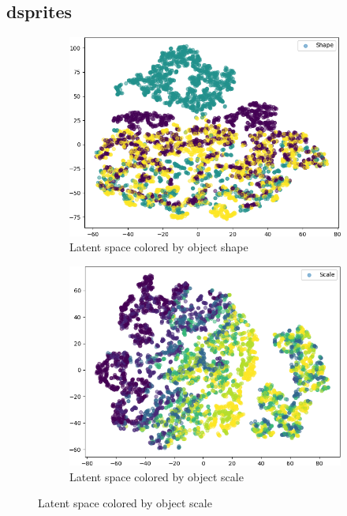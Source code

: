 \documentclass[11pt,a4paper]{article}
\begin{document}
\subsection{dsprites}
\begin{figure}[H]
\centering
\begin{subfigure}{.19\textwidth}
\includegraphics[width=\textwidth]{images/latent_spaces/dsprites/vae_gan/embeddings_mu_0.png}
\caption{Latent space colored by object shape}
\end{subfigure}
\hfill
\begin{subfigure}{.19\textwidth}
\includegraphics[width=\textwidth]{images/latent_spaces/dsprites/vae_gan/embeddings_mu_1.png}
\caption{Latent space colored by object scale}
\label{subfig:vae_embedding_dsprites_scale}

\end{subfigure}
\end{figure}
\end{document}
